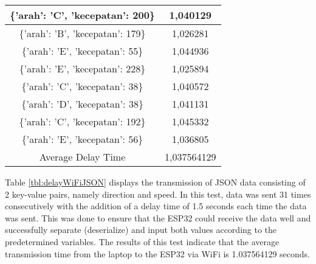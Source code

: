\begin{table}[!h]
\begin{tabular}{|c|c|}
  \{'arah': 'C', 'kecepatan': 200\} & 1,040129    \\ \hline
  \{'arah': 'B', 'kecepatan': 179\} & 1,026281    \\ \hline
  \{'arah': 'E', 'kecepatan': 55\}  & 1,044936    \\ \hline
  \{'arah': 'E', 'kecepatan': 228\} & 1,025894    \\ \hline
  \{'arah': 'C', 'kecepatan': 38\}  & 1,040572    \\ \hline
  \{'arah': 'D', 'kecepatan': 38\}  & 1,041131    \\ \hline
  \{'arah': 'C', 'kecepatan': 192\} & 1,045332    \\ \hline
  \{'arah': 'E', 'kecepatan': 56\}  & 1,036805    \\ \hline
  Average Delay Time                & 1,037564129 \\ \hline
  \end{tabular}
\end{table}

Table \ref{tbl:delayWiFiJSON} displays the transmission of JSON data consisting of 2 key-value pairs, namely direction and speed. In this test, data was sent 31 times consecutively with the addition of a delay time of 1.5 seconds each time the data was sent. This was done to ensure that the ESP32 could receive the data well and successfully separate (deserialize) and input both values according to the predetermined variables. The results of this test indicate that the average transmission time from the laptop to the ESP32 via WiFi is 1.037564129 seconds.

